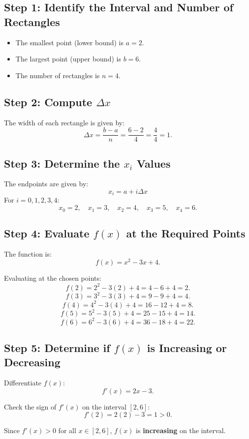 \documentclass{article}
\begin{document}
\subsection*{Step 1: Identify the Interval and Number of Rectangles}
\begin{itemize}
    \item The smallest point (lower bound) is \( a = 2 \).
    \item The largest point (upper bound) is \( b = 6 \).
    \item The number of rectangles is \( n = 4 \).
\end{itemize}

\subsection*{Step 2: Compute \(\Delta x\)}
The width of each rectangle is given by:
\[
\Delta x = \frac{b - a}{n} = \frac{6 - 2}{4} = \frac{4}{4} = 1.
\]

\subsection*{Step 3: Determine the \( x_i \) Values}
The endpoints are given by:
\[
x_i = a + i\Delta x
\]
For \( i = 0,1,2,3,4 \):
\[
x_0 = 2, \quad x_1 = 3, \quad x_2 = 4, \quad x_3 = 5, \quad x_4 = 6.
\]

\subsection*{Step 4: Evaluate \( f(x) \) at the Required Points}
The function is:
\[
f(x) = x^2 - 3x + 4.
\]

Evaluating at the chosen points:
\[
f(2) = 2^2 - 3(2) + 4 = 4 - 6 + 4 = 2.
\]
\[
f(3) = 3^2 - 3(3) + 4 = 9 - 9 + 4 = 4.
\]
\[
f(4) = 4^2 - 3(4) + 4 = 16 - 12 + 4 = 8.
\]
\[
f(5) = 5^2 - 3(5) + 4 = 25 - 15 + 4 = 14.
\]
\[
f(6) = 6^2 - 3(6) + 4 = 36 - 18 + 4 = 22.
\]

\subsection*{Step 5: Determine if \( f(x) \) is Increasing or Decreasing}
Differentiate \( f(x) \):
\[
f'(x) = 2x - 3.
\]

Check the sign of \( f'(x) \) on the interval \([2,6]\):
\[
f'(2) = 2(2) - 3 = 1 > 0.
\]

Since \( f'(x) > 0 \) for all \( x \in [2,6] \), \( f(x) \) is \textbf{increasing} on the interval.
\end{document}

